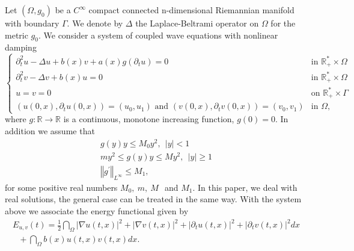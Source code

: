 \documentclass[11pt,reqno]{amsart}
\theoremstyle{plain}
\numberwithin{equation}{section}
\numberwithin{equation}{section}
\begin{document}
Let $\left( \Omega ,g_{0}\right) $ be a $C^{\infty }$ compact connected
n-dimensional Riemannian manifold with boundary $\Gamma .$ We denote by $%
\Delta $ the Laplace-Beltrami operator on $\Omega $ for the metric $g_{0}.$
We consider a system of coupled wave equations with nonlinear damping%
\begin{equation}
\left\{ 
\begin{array}{ll}
\partial _{t}^{2}u-\Delta u+b(x)v+a(x)g(\partial _{t}u)=0 & \text{in }%
\mathbb{R}_{+}^{\ast }\times \Omega  \\ 
\partial _{t}^{2}v-\Delta v+b(x)u=0 & \text{in }\mathbb{R}_{+}^{\ast }\times
\Omega  \\ 
u=v=0 & \text{on }\mathbb{R}_{+}^{\ast }\times \Gamma  \\ 
\left( u\left( 0,x\right) ,\partial _{t}u\left( 0,x\right) \right) =\left(
u_{0},u_{1}\right) \text{ and }\left( v\left( 0,x\right) ,\partial
_{t}v\left( 0,x\right) \right) =\left( v_{0},v_{1}\right)  & \text{in }%
\Omega ,%
\end{array}%
\right.   \label{system intro}
\end{equation}%
where $g:%
\mathbb{R}
\longrightarrow 
\mathbb{R}
$ is a continuous, monotone increasing function, $g(0)=0$. In addition we
assume that%
\begin{equation*}
\begin{array}{l}
g\left( y\right) y\leq M_{0}y^{2},~~\left\vert y\right\vert <1 \\ 
my^{2}\leq g\left( y\right) y\leq My^{2},~~\left\vert y\right\vert \geq 1 \\ 
\left\Vert g^{\prime }\right\Vert _{L^{\infty }}\leq M_{1},%
\end{array}%
\end{equation*}%
for some positive real numbers $M_{0},~m,~M~$\ and $M_{1}$. In this paper,
we deal with real solutions, the general case can be treated in the same
way. With the system above we associate the energy functional given by%
\begin{equation}
\begin{array}{l}
E_{u,v}\left( t\right) =\frac{1}{2}\dint_{\Omega }\left\vert \nabla u\left(
t,x\right) \right\vert ^{2}+\left\vert \nabla v\left( t,x\right) \right\vert
^{2}+\left\vert \partial _{t}u\left( t,x\right) \right\vert ^{2}+\left\vert
\partial _{t}v\left( t,x\right) \right\vert ^{2}dx \\ 
\text{ \ \ \ \ \ \ \ \ \ \ }+\dint_{\Omega }b\left( x\right) u\left(
t,x\right) v\left( t,x\right) dx.%
\end{array}
\label{energy intro}
\end{equation}
\end{document}
